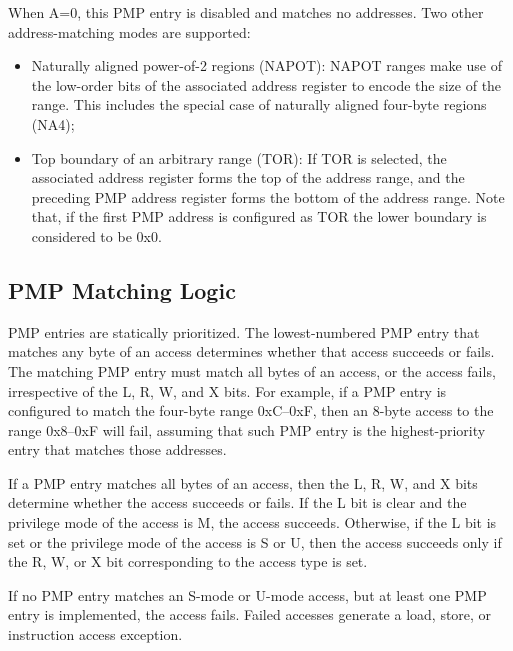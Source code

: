 When A=0, this PMP entry is disabled and matches no addresses. Two other address-matching
modes are supported:
\begin{itemize}
  \item Naturally aligned power-of-2 regions (NAPOT): NAPOT ranges make use of
    the low-order bits of the associated address register to encode the size of
    the range. This includes the special case of naturally aligned four-byte regions
    (NA4);

  \item Top boundary of an arbitrary range (TOR): If TOR is selected, the associated
    address register forms the top of the address range, and the preceding PMP
    address register forms the bottom of the address range. Note that, if the
    first PMP address is configured as TOR the lower boundary is considered to
    be 0x0.
\end{itemize}

\subsection{PMP Matching Logic}
\label{subsec:matchinglogic}

PMP entries are statically prioritized. The lowest-numbered PMP entry that matches
any byte of an access determines whether that access succeeds or fails. The
matching PMP entry must match all bytes of an access, or the access fails,
irrespective of the L, R, W, and X bits. For example, if a PMP entry is configured
to match the four-byte range 0xC–0xF, then an 8-byte access to the range 0x8–0xF
will fail, assuming that such PMP entry is the highest-priority entry that matches
those addresses.

If a PMP entry matches all bytes of an access, then the L, R, W, and X bits determine
whether the access succeeds or fails. If the L bit is clear and the privilege
mode of the access is M, the access succeeds. Otherwise, if the L bit is set or the
privilege mode of the access is S or U, then the access succeeds only if the R, W,
or X bit corresponding to the access type is set.

If no PMP entry matches an S-mode or U-mode access, but at least one PMP entry is
implemented, the access fails. Failed accesses generate a load, store, or instruction
access exception.